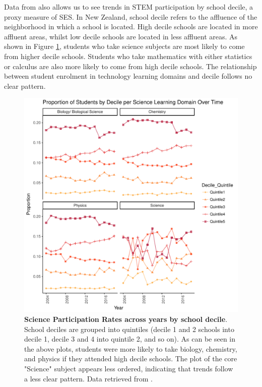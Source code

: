 Data from \cite{EducationCounts_2018} also allows us to see trends in STEM participation by school decile, a proxy measure of SES. In New Zealand, school decile refers to the affluence of the neighborhood in which a school is located. High decile schools are located in more affluent areas, whilst low decile schools are located in less affluent areas. As shown in Figure \ref{fig:STEM_Participation_Decile}, students who take science subjects are most likely to come from higher decile schools. Students who take mathematics with either statistics or calculus are also more likely to come from high decile schools. The relationship between student enrolment in technology learning domains and decile follows no clear pattern.  
\begin{figure}
    \centering
    \includegraphics{C2 - Student Pathways/STEM_Participation_Y13_Proportion_Science_DecileQuintile.pdf}
    \caption{\textbf{Science Participation Rates across years by school decile}. School deciles are grouped into quintiles (decile 1 and 2 schools into decile 1, decile 3 and 4 into quintile 2, and so on). As can be seen in the above plots, students were more likely to take biology, chemistry, and physics if they attended high decile schools. The plot of the core "Science" subject appears less ordered, indicating that trends follow a less clear pattern. Data retrieved from \cite{EducationCounts_2018}.}
    \label{fig:STEM_Participation_Decile}
\end{figure}

